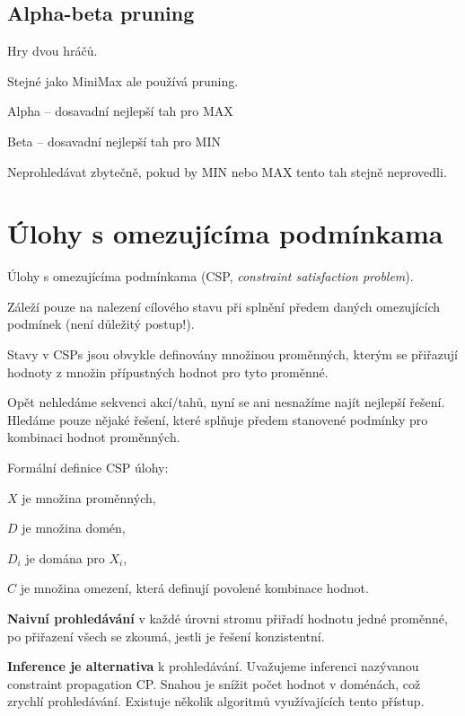 \subsection{Alpha-beta pruning}

\begin{compactitem}
    \item Hry dvou hráčů.
    \item Stejné jako MiniMax ale používá pruning.
    \item Alpha -- dosavadní nejlepší tah pro MAX
    \item Beta -- dosavadní nejlepší tah pro MIN
    \item Neprohledávat zbytečně, pokud by MIN nebo MAX tento tah stejně neprovedli.
\end{compactitem}


\section{Úlohy s omezujícíma podmínkama}

\begin{compactitem}
    \item Úlohy s omezujícíma podmínkama (CSP, \textit{constraint satisfaction problem}).

    \item Záleží pouze na nalezení cílového stavu při splnění předem daných omezujících podmínek (není důležitý postup!).

    \item Stavy v CSPs jsou obvykle definovány množinou proměnných, kterým se přiřazují hodnoty z množin přípustných hodnot pro tyto proměnné.

    \item Opět nehledáme sekvenci akcí/tahů, nyní se ani nesnažíme najít nejlepší řešení. Hledáme pouze nějaké řešení, které splňuje předem stanovené podmínky pro kombinaci hodnot proměnných.

    \item Formální definice CSP úlohy: \begin{compactitem}
        \item $X$ je množina proměnných,
        \item $D$ je množina domén,
        \item $D_i$ je domána pro $X_i$,
        \item $C$ je množina omezení, která definují povolené kombinace hodnot.
    \end{compactitem}

    \item \textbf{Naivní prohledávání} v každé úrovni stromu přiřadí hodnotu jedné proměnné, po přiřazení všech se zkoumá, jestli je řešení konzistentní.

    \item \textbf{Inference je alternativa} k prohledávání. Uvažujeme inferenci nazývanou constraint propagation CP. Snahou je snížit počet hodnot v
    doménách, což zrychlí prohledávání. Existuje několik algoritmů využívajících tento přístup.
\end{compactitem}

